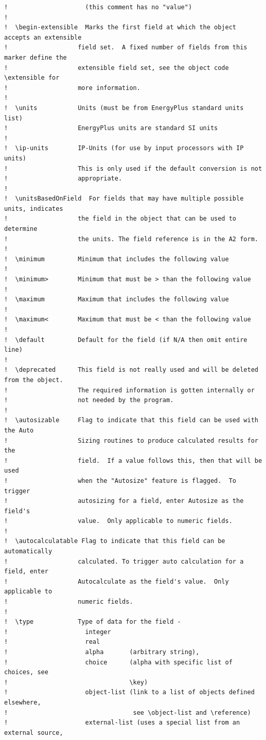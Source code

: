 \begin{lstlisting}
!                     (this comment has no "value")
!
!  \begin-extensible  Marks the first field at which the object accepts an extensible
!                   field set.  A fixed number of fields from this marker define the
!                   extensible field set, see the object code \extensible for
!                   more information.
!
!  \units           Units (must be from EnergyPlus standard units list)
!                   EnergyPlus units are standard SI units
!
!  \ip-units        IP-Units (for use by input processors with IP units)
!                   This is only used if the default conversion is not
!                   appropriate.
!
!  \unitsBasedOnField  For fields that may have multiple possible units, indicates
!                   the field in the object that can be used to determine
!                   the units. The field reference is in the A2 form.
!
!  \minimum         Minimum that includes the following value
!
!  \minimum>        Minimum that must be > than the following value
!
!  \maximum         Maximum that includes the following value
!
!  \maximum<        Maximum that must be < than the following value
!
!  \default         Default for the field (if N/A then omit entire line)
!
!  \deprecated      This field is not really used and will be deleted from the object.
!                   The required information is gotten internally or
!                   not needed by the program.
!
!  \autosizable     Flag to indicate that this field can be used with the Auto
!                   Sizing routines to produce calculated results for the
!                   field.  If a value follows this, then that will be used
!                   when the "Autosize" feature is flagged.  To trigger
!                   autosizing for a field, enter Autosize as the field's
!                   value.  Only applicable to numeric fields.
!
!  \autocalculatable Flag to indicate that this field can be automatically
!                   calculated. To trigger auto calculation for a field, enter
!                   Autocalculate as the field's value.  Only applicable to
!                   numeric fields.
!
!  \type            Type of data for the field -
!                     integer
!                     real
!                     alpha       (arbitrary string),
!                     choice      (alpha with specific list of choices, see
!                                 \key)
!                     object-list (link to a list of objects defined elsewhere,
!                                  see \object-list and \reference)
!                     external-list (uses a special list from an external source,

\end{lstlisting}
